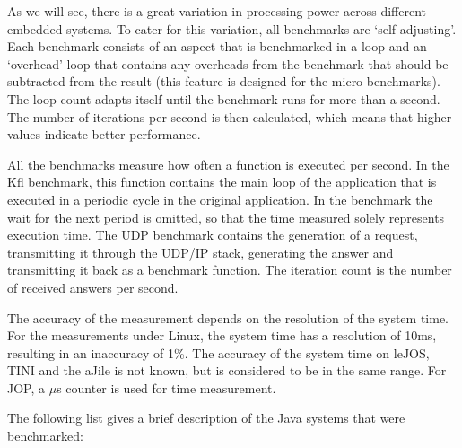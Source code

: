 As we will see, there is a great variation in processing power
across different embedded systems. To cater for this variation, all
benchmarks are `self adjusting'. Each benchmark consists of an
aspect that is benchmarked in a loop and an `overhead' loop that
contains any overheads from the benchmark that should be subtracted
from the result (this feature is designed for the micro-benchmarks).
The loop count adapts itself until the benchmark runs for more than
a second. The number of iterations per second is then calculated,
which means that higher values indicate better performance.


All the benchmarks measure how often a function is executed per
second. In the Kfl benchmark, this function contains the main loop
of the application that is executed in a periodic cycle in the
original application. In the benchmark the wait for the next period
is omitted, so that the time measured solely represents execution
time. The UDP benchmark contains the generation of a request,
transmitting it through the UDP/IP stack, generating the answer and
transmitting it back as a benchmark function. The iteration count is
the number of received answers per second.

The accuracy of the measurement depends on the resolution of the
system time. For the measurements under Linux, the system time has a
resolution of 10ms, resulting in an inaccuracy of 1\%. The accuracy
of the system time on leJOS, TINI and the aJile is not known, but is
considered to be in the same range. For JOP, a $\mu$s counter is
used for time measurement.


The following list gives a brief description of the Java systems
that were benchmarked:

